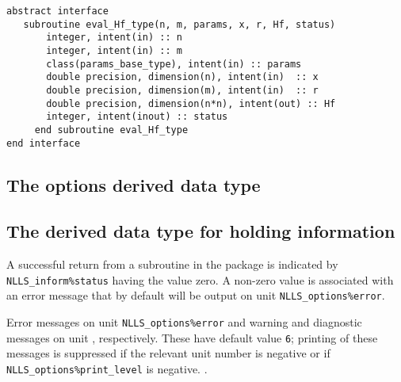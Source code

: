 \documentclass{spec}
\begin{document}
\begin{verbatim}
abstract interface
   subroutine eval_Hf_type(n, m, params, x, r, Hf, status)
       integer, intent(in) :: n
       integer, intent(in) :: m
       class(params_base_type), intent(in) :: params
       double precision, dimension(n), intent(in)  :: x
       double precision, dimension(m), intent(in)  :: r
       double precision, dimension(n*n), intent(out) :: Hf
       integer, intent(inout) :: status
     end subroutine eval_Hf_type
end interface
\end{verbatim}






\subsection{The options derived data type}
\label{typeoptions}




\subsection{The derived data type for holding information}
\label{typeinform}




\hslerrors

A successful return from a subroutine in the package is indicated by
{\tt NLLS\_inform\%status} having the value zero.
A non-zero value is associated with an error message that by default will
be output on unit {\tt NLLS\_options\%error}.



\hslgeneral


\hslio
   Error messages on unit {\tt NLLS\_options\%error} and warning
   and diagnostic messages on unit ,
   respectively. These have default value {\tt 6};
   printing of these messages is suppressed if the relevant unit number
   is negative or if {\tt NLLS\_options\%print\_level} is negative.
.

\hslmethod
\label{method}



\hslexample




\end{document}
